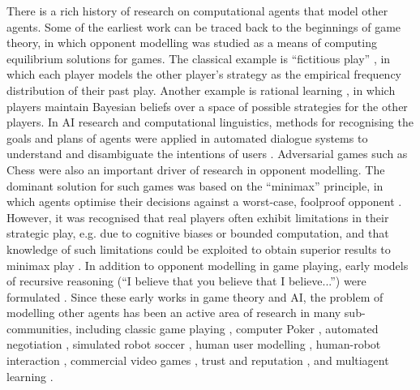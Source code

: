 \documentclass[final,1p,times,authoryear]{elsarticle}
\begin{document}
There is a rich history of research on computational agents that model other agents. Some of the earliest work can be traced back to the beginnings of game theory, in which opponent modelling was studied as a means of computing equilibrium solutions for games. The classical example is ``fictitious play'' \citep{b1951}, in which each player models the other player's strategy as the empirical frequency distribution of their past play. Another example is rational learning \citep{kl1993}, in which players maintain Bayesian beliefs over a space of possible strategies for the other players. In AI research and computational linguistics, methods for recognising the goals and plans of agents \citep{ssg1978} were applied in automated dialogue systems to understand and disambiguate the intentions of users \citep{p1986,la1984}. Adversarial games such as Chess were also an important driver of research in opponent modelling. The dominant solution for such games was based on the ``minimax'' principle, in which agents optimise their decisions against a worst-case, foolproof opponent \citep{cm1983}. However, it was recognised that real players often exhibit limitations in their strategic play, e.g. due to cognitive biases or bounded computation, and that knowledge of such limitations could be exploited to obtain superior results to minimax play \citep{iuhh1994,iuhh1993,cm1993search,rb1983}. In addition to opponent modelling in game playing, early models of recursive reasoning (``I believe that you believe that I believe...'') were formulated \citep[e.g.][]{gdw1991,wb1986}. Since these early works in game theory and AI, the problem of modelling other agents has been an active area of research in many sub-communities, including classic game playing \citep{f2001}, computer Poker \citep{rw2011poker}, automated negotiation \citep{bhhj2016}, simulated robot soccer \citep{1998robocup}, human user modelling \citep{za2001,m1993}, human-robot interaction \citep{lfs2014}, commercial video games \citep{bsl2012}, trust and reputation \citep{rhj2004}, and multiagent learning \citep{sv2000}.
\end{document}
